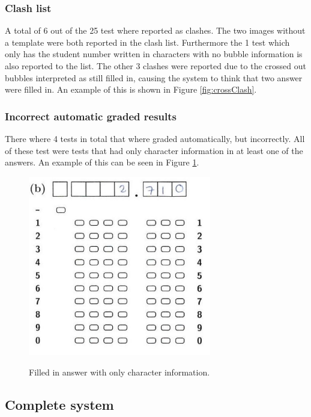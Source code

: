 \subsubsection{Clash list}

A total of 6 out of the 25 test where reported as clashes. The two images without a template were both reported in the clash list. Furthermore the 1 test which only has the student number written in characters with no bubble information is also reported to the list. The other 3 clashes were reported due to the crossed out bubbles interpreted as still filled in, causing the system to think that two answer were filled in. An example of this is shown in Figure \ref{fig:crossClash}.

\subsubsection{Incorrect automatic graded results}

There where 4 tests in total that where graded automatically, but incorrectly. All of these test were tests that had only character information in at least one of the answers. An example of this can be seen in Figure \ref{fig:OnlyCharacters}.

\begin{figure}
  \centering
  \includegraphics[width=8cm]{OnlyCharacters}\\
  \caption{Filled in answer with only character information.}
  \label{fig:OnlyCharacters}
\end{figure}

\subsection{Complete system}

